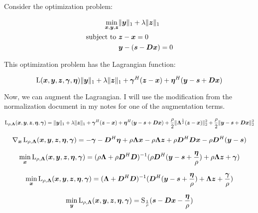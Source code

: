 \documentclass{article}
\begin{document}
Consider the optimization problem:

\begin{equation}
\begin{aligned}
\min_{\bm{x},\bm{y},\bm{z}} & \|\bm{y}\|_1 + \lambda\|\bm{z}\|_1 \\
\text{subject to } & \bm{z} - \bm{x} = 0 \\
                   & \bm{y} - (\bm{s} -\bm{D}\bm{x}) = 0
\end{aligned}
\end{equation}

This optimization problem has the Lagrangian function:

\begin{equation}
\operatorname{L}(\bm{x},\bm{y},\bm{z},\bm{\gamma},\bm{\eta}) \|\bm{y}\|_1 + \lambda\|\bm{z}\|_1 + \bm{\gamma}^H(\bm{z} - \bm{x}) + \bm{\eta}^H(\bm{y} - \bm{s} + \bm{D}\bm{x})
\end{equation}

Now, we can augment the Lagrangian. I will use the modification from the normalization document in my notes for one of the augmentation terms.

\begin{equation}
\operatorname{L}_{\rho,\bm{\Lambda}}(\bm{x},\bm{y},\bm{z},\bm{\eta},\bm{\gamma}) = \|\bm{y}\|_1 + \lambda\|\bm{z}\|_1 + \bm{\gamma}^H(\bm{z} - \bm{x}) + \bm{\eta}^H(\bm{y} - \bm{s} + \bm{D}\bm{x}) + \frac{\rho}{2}\|\bm{\Lambda}^{\frac{1}{2}}(\bm{z} - \bm{x})\|_2^2 + \frac{\rho}{2}\|\bm{y} - \bm{s} + \bm{D}\bm{x}\|_2^2
\end{equation}

\begin{equation}
\nabla_{\bm{x}}\operatorname{L}_{\rho,\bm{\Lambda}}(\bm{x},\bm{y},\bm{z},\bm{\eta},\bm{\gamma}) = -\bm{\gamma} - \bm{D}^H\bm{\eta} + \rho\bm{\Lambda}\bm{x} - \rho\bm{\Lambda}\bm{z} + \rho\bm{D}^H\bm{D}\bm{x} - \rho\bm{D}^H(\bm{y} - \bm{s})
\end{equation}

\begin{equation}
\min_{\bm{x}} \operatorname{L}_{\rho,\bm{\Lambda}}(\bm{x},\bm{y},\bm{z},\bm{\eta},\bm{\gamma}) = (\rho\bm{\Lambda} + \rho\bm{D}^H\bm{D})^{-1}(\rho\bm{D}^H(\bm{y} - \bm{s} + \frac{\bm{\eta}}{\rho}) + \rho\bm{\Lambda}\bm{z} + \bm{\gamma})
\end{equation}

\begin{equation}
\min_{\bm{x}} \operatorname{L}_{\rho,\bm{\Lambda}}(\bm{x},\bm{y},\bm{z},\bm{\eta},\bm{\gamma}) = (\bm{\Lambda} + \bm{D}^H\bm{D})^{-1}(\bm{D}^H(\bm{y} - \bm{s} + \frac{\bm{\eta}}{\rho}) + \bm{\Lambda}\bm{z} + \frac{\bm{\gamma}}{\rho})
\end{equation}

\begin{equation}
\min_{\bm{y}} \operatorname{L}_{\rho,\bm{\Lambda}}(\bm{x},\bm{y},\bm{z},\bm{\eta},\bm{\gamma}) = \operatorname{S}_{\frac{1}{\rho}}(\bm{s} - \bm{D}\bm{x} - \frac{\bm{\eta}}{\rho})
\end{equation}
\end{document}
